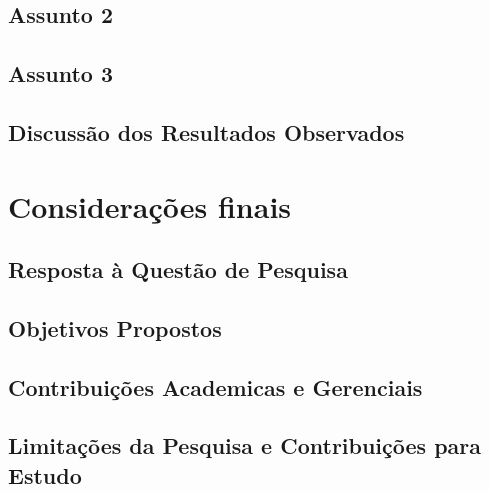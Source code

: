 \section{Assunto 2}
\lipsum[3-5]

\section{Assunto 3}
\lipsum[3-5]

\section{Discussão dos Resultados Observados}
\lipsum[3-5]

\chapter{Considerações finais}
\lipsum[3]

\section{Resposta à Questão de Pesquisa}
\lipsum[3-5]

\section{Objetivos Propostos}
\lipsum[3-5]

\section{Contribuições Academicas e Gerenciais}
\lipsum[3-5]

\section{Limitações da Pesquisa e Contribuições para Estudo}
\lipsum[3-5]





